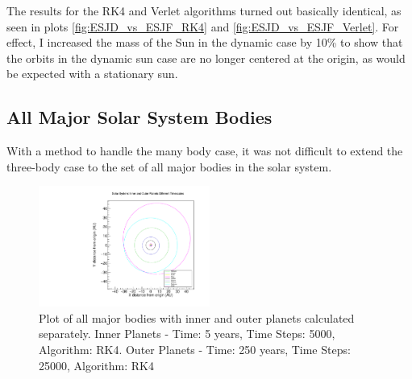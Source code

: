 \documentclass[a4paper,12pt]{report}
\begin{document}
 The results for the RK4 and Verlet algorithms turned out basically identical, as seen in plots \ref{fig:ESJD_vs_ESJF_RK4} and \ref{fig:ESJD_vs_ESJF_Verlet}. For effect, I increased the mass of the Sun in the dynamic case by 10\% to show that the orbits in the dynamic sun case are no longer centered at the origin, as would be expected with a stationary sun.
 
\subsection{All Major Solar System Bodies}

With a method to handle the many body case, it was not difficult to extend the three-body case to the set of all major bodies in the solar system.
  \begin{figure}
 \centering
   \includegraphics[width=0.5\textwidth]{all_bodies_inner_outer_sep_RK4.pdf}
  \caption{Plot of all major bodies with inner and outer planets calculated separately. Inner Planets - Time: 5 years, Time Steps: 5000, Algorithm: RK4. Outer Planets - Time: 250 years, Time Steps: 25000, Algorithm: RK4}
  \label{fig:all_bodies_inner_outer_sep_RK4}
 \end{figure}
\end{document}
